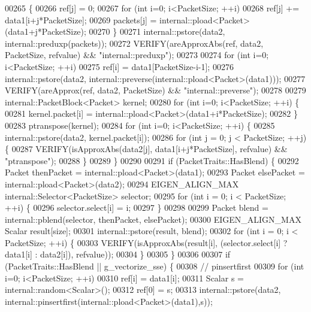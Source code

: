 \begin{DoxyCode}
00265   \{
00266     ref[j] = 0;
00267     \textcolor{keywordflow}{for} (\textcolor{keywordtype}{int} i=0; i<PacketSize; ++i)
00268       ref[j] += data1[i+j*PacketSize];
00269     packets[j] = internal::pload<Packet>(data1+j*PacketSize);
00270   \}
00271   internal::pstore(data2, internal::preduxp(packets));
00272   VERIFY(areApproxAbs(ref, data2, PacketSize, refvalue) && \textcolor{stringliteral}{"internal::preduxp"});
00273 
00274   \textcolor{keywordflow}{for} (\textcolor{keywordtype}{int} i=0; i<PacketSize; ++i)
00275     ref[i] = data1[PacketSize-i-1];
00276   internal::pstore(data2, internal::preverse(internal::pload<Packet>(data1)));
00277   VERIFY(areApprox(ref, data2, PacketSize) && \textcolor{stringliteral}{"internal::preverse"});
00278 
00279   internal::PacketBlock<Packet> kernel;
00280   \textcolor{keywordflow}{for} (\textcolor{keywordtype}{int} i=0; i<PacketSize; ++i) \{
00281     kernel.packet[i] = internal::pload<Packet>(data1+i*PacketSize);
00282   \}
00283   ptranspose(kernel);
00284   \textcolor{keywordflow}{for} (\textcolor{keywordtype}{int} i=0; i<PacketSize; ++i) \{
00285     internal::pstore(data2, kernel.packet[i]);
00286     \textcolor{keywordflow}{for} (\textcolor{keywordtype}{int} j = 0; j < PacketSize; ++j) \{
00287       VERIFY(isApproxAbs(data2[j], data1[i+j*PacketSize], refvalue) && \textcolor{stringliteral}{"ptranspose"});
00288     \}
00289   \}
00290 
00291   \textcolor{keywordflow}{if} (PacketTraits::HasBlend) \{
00292     Packet thenPacket = internal::pload<Packet>(data1);
00293     Packet elsePacket = internal::pload<Packet>(data2);
00294     EIGEN\_ALIGN\_MAX internal::Selector<PacketSize> selector;
00295     \textcolor{keywordflow}{for} (\textcolor{keywordtype}{int} i = 0; i < PacketSize; ++i) \{
00296       selector.select[i] = i;
00297     \}
00298 
00299     Packet blend = internal::pblend(selector, thenPacket, elsePacket);
00300     EIGEN\_ALIGN\_MAX Scalar result[size];
00301     internal::pstore(result, blend);
00302     \textcolor{keywordflow}{for} (\textcolor{keywordtype}{int} i = 0; i < PacketSize; ++i) \{
00303       VERIFY(isApproxAbs(result[i], (selector.select[i] ? data1[i] : data2[i]), refvalue));
00304     \}
00305   \}
00306 
00307   \textcolor{keywordflow}{if} (PacketTraits::HasBlend || g\_vectorize\_sse) \{
00308     \textcolor{comment}{// pinsertfirst}
00309     \textcolor{keywordflow}{for} (\textcolor{keywordtype}{int} i=0; i<PacketSize; ++i)
00310       ref[i] = data1[i];
00311     Scalar s = internal::random<Scalar>();
00312     ref[0] = s;
00313     internal::pstore(data2, internal::pinsertfirst(internal::pload<Packet>(data1),s));

\end{DoxyCode}
